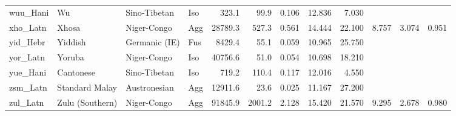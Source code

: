 \begin{tabular}{ll l l rr rr r rr r}
wuu\_Hani & Wu & Sino-Tibetan & Iso & 323.1 & 99.9 & 0.106 & 12.836 & 7.030 &  &  &  \\
xho\_Latn & Xhosa & Niger-Congo & Agg & 28789.3 & 527.3 & 0.561 & 14.444 & 22.100 & 8.757 & 3.074 & 0.951 \\
yid\_Hebr & Yiddish & Germanic (IE) & Fus & 8429.4 & 55.1 & 0.059 & 10.965 & 25.750 &  &  &  \\
yor\_Latn & Yoruba & Niger-Congo & Iso & 40756.6 & 51.0 & 0.054 & 10.698 & 18.210 &  &  &  \\
yue\_Hani & Cantonese & Sino-Tibetan & Iso & 719.2 & 110.4 & 0.117 & 12.016 & 4.550 &  &  &  \\
zsm\_Latn & Standard Malay & Austronesian & Agg & 12911.6 & 23.6 & 0.025 & 11.167 & 27.200 &  &  &  \\
zul\_Latn & Zulu (Southern) & Niger-Congo & Agg & 91845.9 & 2001.2 & 2.128 & 15.420 & 21.570 & 9.295 & 2.678 & 0.980 \\
\bottomrule
\end{tabular}